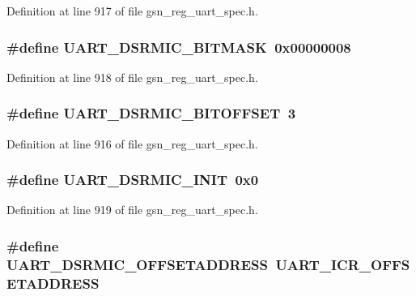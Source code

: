 Definition at line 917 of file gsn\_\-reg\_\-uart\_\-spec.h.

\hypertarget{a00575_a73a3df9111e5f2bc15f95dfd1005dc60}{
\subsubsection[{UART\_\-DSRMIC\_\-BITMASK}]{\setlength{\rightskip}{0pt plus 5cm}\#define UART\_\-DSRMIC\_\-BITMASK~0x00000008}}
\label{a00575_a73a3df9111e5f2bc15f95dfd1005dc60}


Definition at line 918 of file gsn\_\-reg\_\-uart\_\-spec.h.

\hypertarget{a00575_a2a15b8ef414b08b9b9e85559460406da}{
\subsubsection[{UART\_\-DSRMIC\_\-BITOFFSET}]{\setlength{\rightskip}{0pt plus 5cm}\#define UART\_\-DSRMIC\_\-BITOFFSET~3}}
\label{a00575_a2a15b8ef414b08b9b9e85559460406da}


Definition at line 916 of file gsn\_\-reg\_\-uart\_\-spec.h.

\hypertarget{a00575_a7c0027fd02c4151add3753c16dbf9e62}{
\subsubsection[{UART\_\-DSRMIC\_\-INIT}]{\setlength{\rightskip}{0pt plus 5cm}\#define UART\_\-DSRMIC\_\-INIT~0x0}}
\label{a00575_a7c0027fd02c4151add3753c16dbf9e62}


Definition at line 919 of file gsn\_\-reg\_\-uart\_\-spec.h.

\hypertarget{a00575_a6aec5a5008d3b69b723f37107410c8a6}{
\subsubsection[{UART\_\-DSRMIC\_\-OFFSETADDRESS}]{\setlength{\rightskip}{0pt plus 5cm}\#define UART\_\-DSRMIC\_\-OFFSETADDRESS~UART\_\-ICR\_\-OFFSETADDRESS}}
\label{a00575_a6aec5a5008d3b69b723f37107410c8a6}


